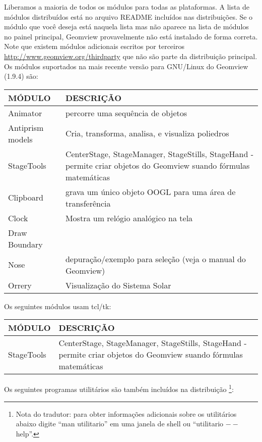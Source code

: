 \documentclass[12pt,a4paper]{article}
\begin{document}
        Liberamos a maioria de todos os m\'{o}dulos para todas as plataformas. A lista de
        m\'{o}dulos distribu\'idos est\'a no arquivo README inclu\'idos nas distribui\c{c}\~oes.
        Se o m\'{o}dulo que voc\^e deseja est\'a naquela lista mas n\~ao aparece na lista de
        m\'{o}dulos no painel principal, Geomview provavelmente n\~ao est\'a instalado de forma correta. Note
        que existem m\'{o}dulos adicionais escritos por terceiros
        \url{http://www.geomview.org/thirdparty} que n\~ao s\~ao parte da distribui\c{c}\~ao
        principal. Os m\'{o}dulos suportados na mais recente vers\~ao para GNU/Linux do
        Geomview (1.9.4) s\~ao:\\
        \begin{center}
        \begin{tabular}{|l|p{8cm}|}
        \hline
        M\'ODULO & DESCRI\c{C}\~AO \\ \hline
        Animator & percorre uma sequ\^encia de objetos \\ \hline
        Antiprism models & Cria, transforma, analisa, e visualiza poliedros\\ \hline
        StageTools & CenterStage, StageManager, StageStills, StageHand - permite criar objetos do Geomview suando f\'{o}rmulas matem\'aticas \\ \hline
        Clipboard & grava um \'unico objeto OOGL para uma \'area de transfer\^encia \\ \hline
        Clock & Mostra um rel\'{o}gio anal\'{o}gico na tela \\ \hline
        Draw Boundary & \\ \hline
        Nose & depura\c{c}\~ao/exemplo para sele\c{c}\~ao (veja o manual do Geomview) \\ \hline
        Orrery & Visualiza\c{c}\~ao do Sistema Solar \\ \hline
        \end{tabular}
	\end{center}
        Os seguintes m\'{o}dulos usam tcl/tk:
        \begin{center}
        \begin{tabular}{|l|p{8cm}|}
        \hline
        M\'ODULO & DESCRI\c{C}\~AO \\ \hline
        StageTools & CenterStage, StageManager, StageStills, StageHand - permite criar objetos do Geomview suando f\'{o}rmulas matem\'aticas \\ \hline
        \end{tabular}
	\end{center}
        Os seguintes programas utilit\'arios s\~ao tamb\'em inclu\'idos na distribui\c{c}\~ao
        \footnote{Nota do tradutor: para obter informa\c{c}\~oes adicionais sobre os utilit\'arios abaixo digite
        ``man utilitario'' em uma janela de shell ou ``utilitario $--$help''.}:
	
\end{document}
